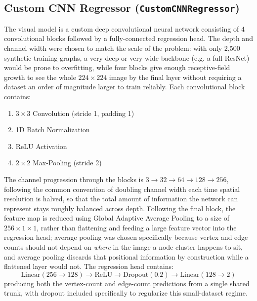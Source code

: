 \documentclass[11pt,letterpaper]{article}
\numberwithin{equation}{section}
\numberwithin{figure}{section}
\numberwithin{table}{section}
\begin{document}
\subsection{Custom CNN Regressor (\texttt{CustomCNNRegressor})}
The visual model is a custom deep convolutional neural network consisting of 4 convolutional blocks followed by a fully-connected regression head. The depth and channel width were chosen to match the scale of the problem: with only 2,500 synthetic training graphs, a very deep or very wide backbone (e.g. a full ResNet) would be prone to overfitting, while four blocks give enough receptive-field growth to see the whole $224\times224$ image by the final layer without requiring a dataset an order of magnitude larger to train reliably.
Each convolutional block contains:
\begin{enumerate}
    \item $3 \times 3$ Convolution (stride 1, padding 1)
    \item 1D Batch Normalization
    \item ReLU Activation
    \item $2 \times 2$ Max-Pooling (stride 2)
\end{enumerate}
The channel progression through the blocks is $3 \rightarrow 32 \rightarrow 64 \rightarrow 128 \rightarrow 256$, following the common convention of doubling channel width each time spatial resolution is halved, so that the total amount of information the network can represent stays roughly balanced across depth. Following the final block, the feature map is reduced using Global Adaptive Average Pooling to a size of $256 \times 1 \times 1$, rather than flattening and feeding a large feature vector into the regression head; average pooling was chosen specifically because vertex and edge counts should not depend on \emph{where} in the image a node cluster happens to sit, and average pooling discards that positional information by construction while a flattened layer would not. The regression head contains:
\begin{equation*}
\text{Linear}(256 \rightarrow 128) \rightarrow \text{ReLU} \rightarrow \text{Dropout}(0.2) \rightarrow \text{Linear}(128 \rightarrow 2)
\end{equation*}
producing both the vertex-count and edge-count predictions from a single shared trunk, with dropout included specifically to regularize this small-dataset regime.
\end{document}
